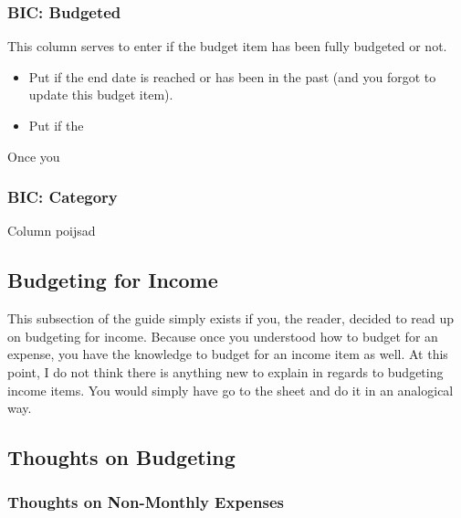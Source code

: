 \subsubsection{BIC: Budgeted}
\label{subsubsec:budgeting-item-column-budgeted}

This column serves to enter if the budget item has been fully budgeted or not.
\begin{itemize}
	\item Put  if the end date is reached or has been in the past (and you forgot to update this budget item).
	\item Put  if the 
\end{itemize}

Once you 

\subsubsection{BIC: Category}
\label{subsubsec:budgeting-item-column-category}

Column  poijsad

\subsection{Budgeting for Income}
\label{subsec:budgeting-income}

This subsection of the guide simply exists if you, the reader, decided to read up on budgeting for income.
Because once you understood how to budget for an expense, you have the knowledge to budget for an income item as well.
At this point, I do not think there is anything new to explain in regards to budgeting income items.
You would simply have go to the sheet  and do it in an analogical way.

\subsection{Thoughts on Budgeting}
\label{subsec:thoughts-on-budgeting}

\subsubsection{Thoughts on Non-Monthly Expenses}
\label{subsubsec:thoughts-non-monthly-expenses}

